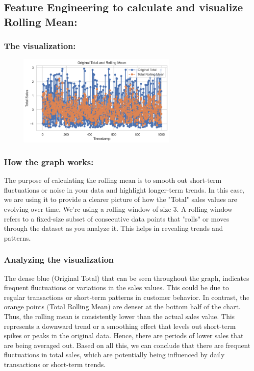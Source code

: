 \subsection{Feature Engineering to calculate and visualize Rolling Mean:}
\newpage 
\subsubsection{The visualization:}
\begin{figure}[h]
    \centering
    \includegraphics[width=0.7\textwidth]{Chapters/ch6/ch_6_rolling_mean.png}
\end{figure}

\subsubsection{How the graph works: }
The purpose of calculating the rolling mean is to smooth out short-term fluctuations or noise in your data and highlight longer-term trends. In this case, we are using it to provide a clearer picture of how the "Total" sales values are evolving over time. We’re using a rolling window of size 3. A rolling window refers to a fixed-size subset of consecutive data points that "rolls" or moves through the dataset as you analyze it. This helps in revealing trends and patterns.

\subsubsection{Analyzing the visualization}
The dense blue (Original Total) that can be seen throughout the graph, indicates frequent fluctuations or variations in the sales values. This could be due to regular transactions or short-term patterns in customer behavior. \newline 
In contrast, the orange points (Total Rolling Mean) are denser at the bottom half of the chart. Thus, the rolling mean is consistently lower than the actual sales value. This represents a downward trend or a smoothing effect that levels out short-term spikes or peaks in the original data. Hence, there are periods of lower sales that are being averaged out.
\newline 
Based on all this, we can conclude that there are frequent fluctuations in total sales, which are potentially being influenced by daily transactions or short-term trends. 

